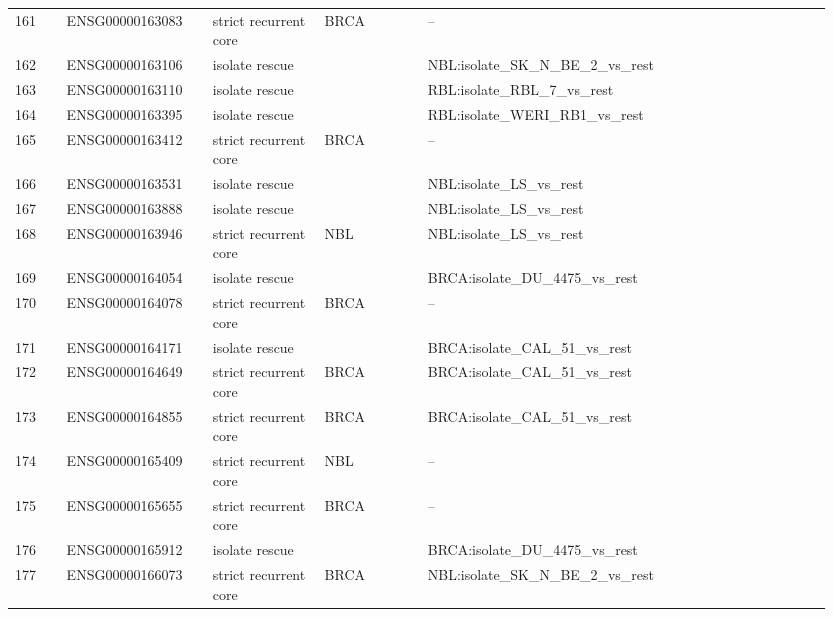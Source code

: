 \begin{landscape}
{\begin{longtable}{p{0.06\linewidth}p{0.17\linewidth}p{0.13\linewidth}p{0.12\linewidth}p{0.47\linewidth}}
161 & ENSG00000163083 & strict recurrent core & BRCA & -- \\
162 & ENSG00000163106 & isolate rescue &  & NBL:isolate\_\allowbreak{}SK\_\allowbreak{}N\_\allowbreak{}BE\_\allowbreak{}2\_\allowbreak{}vs\_\allowbreak{}rest \\
163 & ENSG00000163110 & isolate rescue &  & RBL:isolate\_\allowbreak{}RBL\_\allowbreak{}7\_\allowbreak{}vs\_\allowbreak{}rest \\
164 & ENSG00000163395 & isolate rescue &  & RBL:isolate\_\allowbreak{}WERI\_\allowbreak{}RB1\_\allowbreak{}vs\_\allowbreak{}rest \\
165 & ENSG00000163412 & strict recurrent core & BRCA & -- \\
166 & ENSG00000163531 & isolate rescue &  & NBL:isolate\_\allowbreak{}LS\_\allowbreak{}vs\_\allowbreak{}rest \\
167 & ENSG00000163888 & isolate rescue &  & NBL:isolate\_\allowbreak{}LS\_\allowbreak{}vs\_\allowbreak{}rest \\
168 & ENSG00000163946 & strict recurrent core & NBL & NBL:isolate\_\allowbreak{}LS\_\allowbreak{}vs\_\allowbreak{}rest \\
169 & ENSG00000164054 & isolate rescue &  & BRCA:isolate\_\allowbreak{}DU\_\allowbreak{}4475\_\allowbreak{}vs\_\allowbreak{}rest \\
170 & ENSG00000164078 & strict recurrent core & BRCA & -- \\
171 & ENSG00000164171 & isolate rescue &  & BRCA:isolate\_\allowbreak{}CAL\_\allowbreak{}51\_\allowbreak{}vs\_\allowbreak{}rest \\
172 & ENSG00000164649 & strict recurrent core & BRCA & BRCA:isolate\_\allowbreak{}CAL\_\allowbreak{}51\_\allowbreak{}vs\_\allowbreak{}rest \\
173 & ENSG00000164855 & strict recurrent core & BRCA & BRCA:isolate\_\allowbreak{}CAL\_\allowbreak{}51\_\allowbreak{}vs\_\allowbreak{}rest \\
174 & ENSG00000165409 & strict recurrent core & NBL & -- \\
175 & ENSG00000165655 & strict recurrent core & BRCA & -- \\
176 & ENSG00000165912 & isolate rescue &  & BRCA:isolate\_\allowbreak{}DU\_\allowbreak{}4475\_\allowbreak{}vs\_\allowbreak{}rest \\
177 & ENSG00000166073 & strict recurrent core & BRCA & NBL:isolate\_\allowbreak{}SK\_\allowbreak{}N\_\allowbreak{}BE\_\allowbreak{}2\_\allowbreak{}vs\_\allowbreak{}rest \\

\end{longtable}}
\end{landscape}
